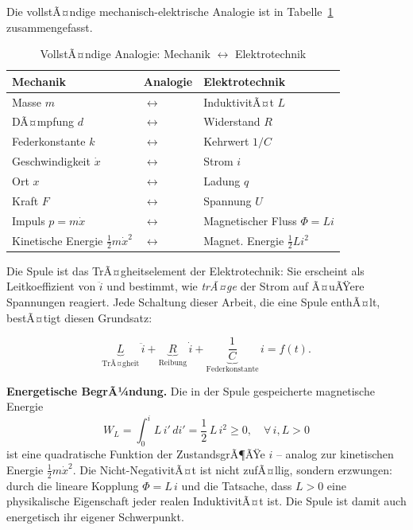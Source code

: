 ﻿\documentclass[12pt, a4paper]{article}
\begin{document}
	Die vollstÃ¤ndige mechanisch-elektrische Analogie ist in Tabelle~\ref{tab:analogie}
	zusammengefasst.
	
	\begin{table}[h]
		\centering
		\caption{VollstÃ¤ndige Analogie: Mechanik $\longleftrightarrow$ Elektrotechnik}
		\begin{tabular}{>{\centering\arraybackslash}p{4cm}
				>{\centering\arraybackslash}p{2cm}
				>{\centering\arraybackslash}p{4cm}}
			\toprule
			\textbf{Mechanik} & \textbf{Analogie} & \textbf{Elektrotechnik} \\
			\midrule
			Masse $m$ & $\longleftrightarrow$ & InduktivitÃ¤t $L$ \\
			DÃ¤mpfung $d$ & $\longleftrightarrow$ & Widerstand $R$ \\
			Federkonstante $k$ & $\longleftrightarrow$ & Kehrwert $1/C$ \\
			Geschwindigkeit $\dot{x}$ & $\longleftrightarrow$ & Strom $i$ \\
			Ort $x$ & $\longleftrightarrow$ & Ladung $q$ \\
			Kraft $F$ & $\longleftrightarrow$ & Spannung $U$ \\
			Impuls $p = m\dot{x}$ & $\longleftrightarrow$ & Magnetischer Fluss $\Phi = Li$ \\
			Kinetische Energie $\tfrac{1}{2}m\dot{x}^2$ & $\longleftrightarrow$ &
			Magnet. Energie $\tfrac{1}{2}Li^2$ \\
			\bottomrule
		\end{tabular}
		\label{tab:analogie}
	\end{table}
	
	Die Spule ist das TrÃ¤gheitselement der Elektrotechnik: Sie erscheint als
	Leitkoeffizient von $\ddot{i}$ und bestimmt, wie \emph{trÃ¤ge} der Strom auf
	Ã¤uÃŸere Spannungen reagiert. Jede Schaltung dieser Arbeit, die eine Spule
	enthÃ¤lt, bestÃ¤tigt diesen Grundsatz:
	
	\begin{equation}
		\underbrace{L}_{\mathrm{TrÃ¤gheit}}\,\ddot{i}
		+ \underbrace{R}_{\mathrm{Reibung}}\,\dot{i}
		+ \underbrace{\frac{1}{C}}_{\mathrm{Federkonstante}}\,i = f(t).
	\end{equation}
	
	\textbf{Energetische BegrÃ¼ndung.}
	Die in der Spule gespeicherte magnetische Energie
	\begin{equation}
		W_L = \int_0^{i} L\,i'\,di' = \frac{1}{2}\,L\,i^2 \geq 0, \quad \forall\, i, L > 0
	\end{equation}
	ist eine quadratische Funktion der ZustandsgrÃ¶ÃŸe $i$ -- analog zur kinetischen
	Energie $\tfrac{1}{2}m\dot{x}^2$. Die Nicht-NegativitÃ¤t ist nicht zufÃ¤llig,
	sondern erzwungen: durch die lineare Kopplung $\Phi = L\,i$ und die Tatsache,
	dass $L > 0$ eine physikalische Eigenschaft jeder realen InduktivitÃ¤t ist.
	Die Spule ist damit auch energetisch ihr eigener Schwerpunkt.
	
\end{document}
